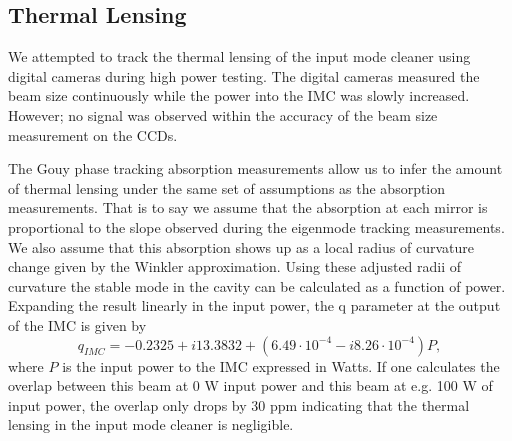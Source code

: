 \subsection{Thermal Lensing}
We attempted to track the thermal lensing of the input mode cleaner using digital 
cameras during high power testing.  
The digital cameras measured the beam size continuously while the power into the 
IMC was slowly increased.  
However; no signal was observed within the accuracy of the beam size measurement on the CCDs.  

The Gouy phase tracking absorption measurements allow us to infer the amount of thermal 
lensing under the same set of assumptions as the absorption measurements.  
That is to say we assume that the absorption at each mirror is proportional to the slope 
observed during the eigenmode tracking measurements.  
We also assume that this absorption shows up as a local radius of curvature change 
given by the Winkler approximation.  
Using these adjusted radii of curvature the stable mode in the cavity can be calculated 
as a function of power.  
Expanding the result linearly in the input power, the q parameter at the 
output of the IMC is given by 
\begin{equation}
	q_{IMC}=-0.2325+i13.3832+(6.49\cdot10^{-4}-i8.26\cdot10^{-4})P,
\end{equation}	
where $P$ is the input power to the IMC expressed in Watts.  
If one calculates the overlap between this beam at 0 W input power and 
this beam at e.g. 100 W of input power, the overlap only drops by 30 ppm indicating that 
the thermal lensing in the input mode cleaner is negligible.  

